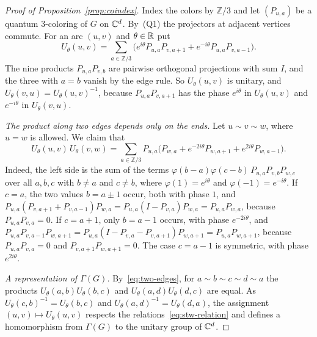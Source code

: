 \begin{proof}[Proof of Proposition~\ref{prop:coindex}]
Index the colors by $\mathbb Z/3$ and let $(P_{u,a})$ be a quantum $3$-coloring of $G$ on $\mathbb C^d$. By~(Q1) the projectors at adjacent vertices commute. For an arc $(u,v)$ and $\theta\in\mathbb R$ put
\[
 U_\theta(u,v)=\sum_{a\in\mathbb Z/3}\bigl(e^{i\theta}P_{u,a}P_{v,a+1}+e^{-i\theta}P_{u,a}P_{v,a-1}\bigr).
\]
The nine products $P_{u,a}P_{v,b}$ are pairwise orthogonal projections with sum $I$, and the three with $a=b$ vanish by the edge rule. So $U_\theta(u,v)$ is unitary, and $U_\theta(v,u)=U_\theta(u,v)^{-1}$, because $P_{u,a}P_{v,a+1}$ has the phase $e^{i\theta}$ in $U_\theta(u,v)$ and $e^{-i\theta}$ in $U_\theta(v,u)$.

\emph{The product along two edges depends only on the ends.} Let $u\sim v\sim w$, where $u=w$ is allowed. We claim that
\begin{equation}\label{eq:two-edges}
 U_\theta(u,v)\,U_\theta(v,w)=\sum_{a\in\mathbb Z/3}P_{u,a}\bigl(P_{w,a}+e^{-2i\theta}P_{w,a+1}+e^{2i\theta}P_{w,a-1}\bigr).
\end{equation}
Indeed, the left side is the sum of the terms $\varphi(b-a)\varphi(c-b)\,P_{u,a}P_{v,b}P_{w,c}$ over all $a,b,c$ with $b\ne a$ and $c\ne b$, where $\varphi(1)=e^{i\theta}$ and $\varphi(-1)=e^{-i\theta}$. If $c=a$, the two values $b=a\pm1$ occur, both with phase $1$, and $P_{u,a}(P_{v,a+1}+P_{v,a-1})P_{w,a}=P_{u,a}(I-P_{v,a})P_{w,a}=P_{u,a}P_{w,a}$, because $P_{u,a}P_{v,a}=0$. If $c=a+1$, only $b=a-1$ occurs, with phase $e^{-2i\theta}$, and $P_{u,a}P_{v,a-1}P_{w,a+1}=P_{u,a}(I-P_{v,a}-P_{v,a+1})P_{w,a+1}=P_{u,a}P_{w,a+1}$, because $P_{u,a}P_{v,a}=0$ and $P_{v,a+1}P_{w,a+1}=0$. The case $c=a-1$ is symmetric, with phase $e^{2i\theta}$.

\emph{A representation of $\Gamma(G)$.} By~\eqref{eq:two-edges}, for $a\sim b\sim c\sim d\sim a$ the products $U_\theta(a,b)U_\theta(b,c)$ and $U_\theta(a,d)U_\theta(d,c)$ are equal. As $U_\theta(c,b)^{-1}=U_\theta(b,c)$ and $U_\theta(a,d)^{-1}=U_\theta(d,a)$, the assignment $(u,v)\mapsto U_\theta(u,v)$ respects the relations~\eqref{eq:stw-relation} and defines a homomorphism from $\Gamma(G)$ to the unitary group of $\mathbb C^d$.


\end{proof}
